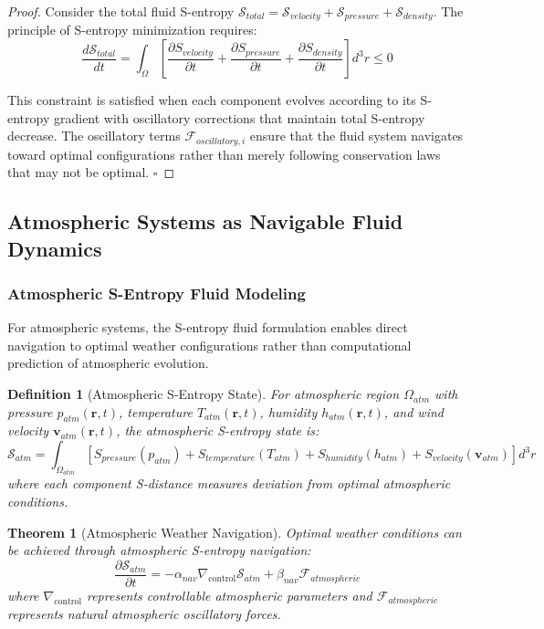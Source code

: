 \documentclass[12pt,a4paper]{article}
\newtheorem{theorem}{Theorem}
\newtheorem{definition}{Definition}
\begin{document}
\begin{proof}
Consider the total fluid S-entropy $\mathcal{S}_{total} = \mathcal{S}_{velocity} + \mathcal{S}_{pressure} + \mathcal{S}_{density}$. The principle of S-entropy minimization requires:
\begin{equation}
\frac{d\mathcal{S}_{total}}{dt} = \int_{\Omega} \left[ \frac{\partial S_{velocity}}{\partial t} + \frac{\partial S_{pressure}}{\partial t} + \frac{\partial S_{density}}{\partial t} \right] d^3r \leq 0
\end{equation}

This constraint is satisfied when each component evolves according to its S-entropy gradient with oscillatory corrections that maintain total S-entropy decrease. The oscillatory terms $\mathcal{F}_{oscillatory,i}$ ensure that the fluid system navigates toward optimal configurations rather than merely following conservation laws that may not be optimal. $\square$
\end{proof}

\subsection{Atmospheric Systems as Navigable Fluid Dynamics}

\subsubsection{Atmospheric S-Entropy Fluid Modeling}

For atmospheric systems, the S-entropy fluid formulation enables direct navigation to optimal weather configurations rather than computational prediction of atmospheric evolution.

\begin{definition}[Atmospheric S-Entropy State]
For atmospheric region $\Omega_{atm}$ with pressure $p_{atm}(\mathbf{r}, t)$, temperature $T_{atm}(\mathbf{r}, t)$, humidity $h_{atm}(\mathbf{r}, t)$, and wind velocity $\mathbf{v}_{atm}(\mathbf{r}, t)$, the atmospheric S-entropy state is:
\begin{equation}
\mathcal{S}_{atm} = \int_{\Omega_{atm}} \left[ S_{pressure}(p_{atm}) + S_{temperature}(T_{atm}) + S_{humidity}(h_{atm}) + S_{velocity}(\mathbf{v}_{atm}) \right] d^3r
\end{equation}
where each component S-distance measures deviation from optimal atmospheric conditions.
\end{definition}

\begin{theorem}[Atmospheric Weather Navigation]
Optimal weather conditions can be achieved through atmospheric S-entropy navigation:
\begin{equation}
\frac{\partial \mathcal{S}_{atm}}{\partial t} = -\alpha_{nav} \nabla_{\text{control}} \mathcal{S}_{atm} + \beta_{nav} \mathcal{F}_{atmospheric}
\end{equation}
where $\nabla_{\text{control}}$ represents controllable atmospheric parameters and $\mathcal{F}_{atmospheric}$ represents natural atmospheric oscillatory forces.
\end{theorem}
\end{document}
